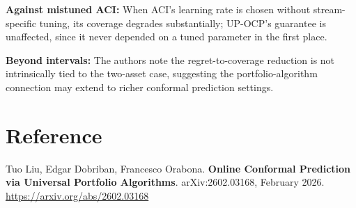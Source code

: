 \documentclass[10pt,twocolumn]{article}
\begin{document}
\textbf{Against mistuned ACI:} When ACI's learning rate is chosen
without stream-specific tuning, its coverage degrades substantially;
UP-OCP's guarantee is unaffected, since it never depended on a tuned
parameter in the first place.

\textbf{Beyond intervals:} The authors note the regret-to-coverage
reduction is not intrinsically tied to the two-asset case, suggesting
the portfolio-algorithm connection may extend to richer conformal
prediction settings.

\section*{Reference}

Tuo Liu, Edgar Dobriban, Francesco Orabona.
\textbf{Online Conformal Prediction via Universal Portfolio Algorithms}.
arXiv:2602.03168, February 2026.
\url{https://arxiv.org/abs/2602.03168}
\end{document}
